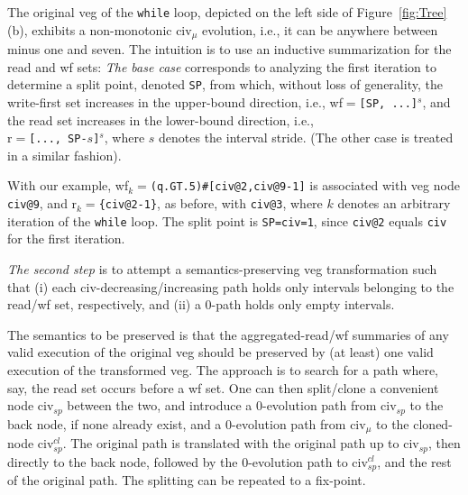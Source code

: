\documentclass{sig-alternate}
\begin{document}
The original {\sc veg} of the {\tt while} loop, depicted on the left 
side of Figure~\ref{fig:Tree}(b), exhibits a non-monotonic {\sc civ}$_\mu$
evolution, i.e., it can be anywhere between minus one and seven.
%
The intuition is to use an inductive summarization for the read and {\sc wf} sets:
{\em The base case} corresponds to analyzing the first iteration to determine a split point, 
denoted {\tt SP}, from which, without loss of generality, the write-first set increases in the 
upper-bound direction, i.e., {\sc wf}$=${\tt[SP, ...]$^s$}, and the read set increases in the lower-bound
direction, i.e., \\
{\sc r}$=${\tt [..., SP-$s$]$^s$}, where $s$ denotes the interval stride.
(The other case is treated in a similar fashion).

With our example, {\sc wf}$_k=${\tt (q.GT.5)\#[civ@2,civ@9-1]}
is associated with {\sc veg} node {\tt civ@9}, and 
{\sc r}$_k=${\tt \{civ@2-1\}}, as before, with {\tt civ@3}, 
where $k$ denotes an arbitrary iteration of the {\tt while} loop.
The split point is {\tt SP=civ=1}, since {\tt civ@2} equals {\tt civ} 
for the first iteration.



{\em The second step} is to attempt a semantics-preserving {\sc veg} transformation
such that (i) each {\sc civ}-decreasing/increasing path holds only intervals 
belonging to the read/{\sc wf} set, respectively, and (ii) a $0$-path holds
only empty intervals.

The semantics to be preserved is that the aggregated-read/{\sc wf} summaries of
any valid execution of the original {\sc veg} should be preserved by (at least) one 
valid execution of the transformed {\sc veg}.  The approach is
to search for a path where, say, the read set occurs before a {\sc wf} set.
One can then split/clone a convenient node {\sc civ}$_{sp}$ between the two, and 
introduce a $0$-evolution path from {\sc civ}$_{sp}$ to the back node, if none already exist,
and a $0$-evolution path from {\sc civ}$_\mu$ to the cloned-node {\sc civ}$_{sp}^{cl}$.
The original path is translated with the original path up to {\sc civ}$_{sp}$,
then directly to the back node, followed by the $0$-evolution path to  
{\sc civ}$_{sp}^{cl}$, and the rest of the original path. The splitting can be
repeated to a fix-point.
\end{document}
